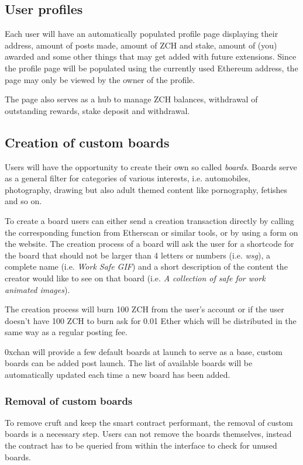 \documentclass[a4paper]{article}
\newcommand{\projectname}{0xchan}
\begin{document}
\subsection{User profiles}
Each user will have an automatically populated profile page displaying their address, amount of posts made, amount of ZCH and stake, amount of (you) awarded and some other things that may get added with future extensions. Since the profile page will be populated using the currently used Ethereum address, the page may only be viewed by the owner of the profile.

The page also serves as a hub to manage ZCH balances, withdrawal of outstanding rewards, stake deposit and withdrawal.

\subsection{Creation of custom boards}
Users will have the opportunity to create their own so called \emph{boards}. Boards serve as a general filter for categories of various interests, i.e. automobiles, photography, drawing but also adult themed content like pornography, fetishes and so on.

To create a board users can either send a creation transaction directly by calling the corresponding function from Etherscan or similar tools, or by using a form on the website. The creation process of a board will ask the user for a shortcode for the board that should not be larger than 4 letters or numbers (i.e. \emph{wsg}), a complete name (i.e. \emph{Work Safe GIF}) and a short description of the content the creator would like to see on that board (i.e. \emph{A collection of safe for work animated images}).

The creation process will burn 100 ZCH from the user's account or if the user doesn't have 100 ZCH to burn ask for 0.01 Ether which will be distributed in the same way as a regular posting fee.

\projectname{} will provide a few default boards at launch to serve as a base, custom boards can be added post launch. The list of available boards will be automatically updated each time a new board has been added.

\subsubsection{Removal of custom boards}
To remove cruft and keep the smart contract performant, the removal of custom boards is a necessary step. Users can not remove the boards themselves, instead the contract has to be queried from within the interface to check for unused boards.
\end{document}
